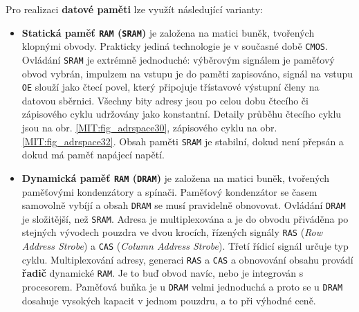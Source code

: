       Pro realizaci \textbf{datové paměti} lze využít následující varianty:
      \begin{itemize}[noitemsep]
        \item \textbf{Statická paměť \texttt{RAM} (\texttt{SRAM})} je založena na matici buněk,  
              tvořených klopnými obvody. Prakticky jediná technologie je v současné době 
              \texttt{CMOS}. Ovládání \texttt{SRAM} je extrémně jednoduché: výběrovým signálem 
               je paměťový  obvod vybrán, impulzem na vstupu 
               je do paměti zapisováno, signál na vstupu            
              \texttt{OE} slouží jako čtecí povel, který připojuje třístavové výstupní členy na 
              datovou sběrnici. Všechny bity adresy jsou po celou dobu čtecího či zápisového cyklu 
              udržovány jako konstantní. Detaily průběhu čtecího cyklu jsou na obr. 
              \ref{MIT:fig_adrspace30}, zápisového  cyklu na obr. \ref{MIT:fig_adrspace32}. Obsah 
              paměti \texttt{SRAM} je stabilní, dokud není přepsán a dokud má paměť napájecí napětí.
        \item \textbf{Dynamická paměť \texttt{RAM} (\texttt{DRAM})} je založena na matici buněk,  
              tvořených paměťovými kondenzátory a spínači. Paměťový kondenzátor se časem samovolně 
              vybíjí a obsah \texttt{DRAM} se musí pravidelně obnovovat. Ovládání \texttt{DRAM} je 
              složitější, než \texttt{SRAM}. Adresa je multiplexována a je do obvodu přiváděna po 
              stejných vývodech pouzdra ve dvou krocích, řízených signály \texttt{RAS} (\emph{Row 
              Address Strobe}) a \texttt{CAS} (\emph{Column Address Strobe}). Třetí řídicí signál 
               určuje typ cyklu. Multiplexování adresy, generaci 
              \texttt{RAS} a \texttt{CAS} a obnovování obsahu provádí \textbf{řadič} dynamické 
              \texttt{RAM}. Je to buď obvod navíc, nebo je integrován s procesorem. 
              Paměťová buňka je u \texttt{DRAM} velmi jednoduchá a proto se u \texttt{DRAM} 
              dosahuje vysokých kapacit v jednom pouzdru, a to při výhodné ceně.
      \end{itemize}
      
